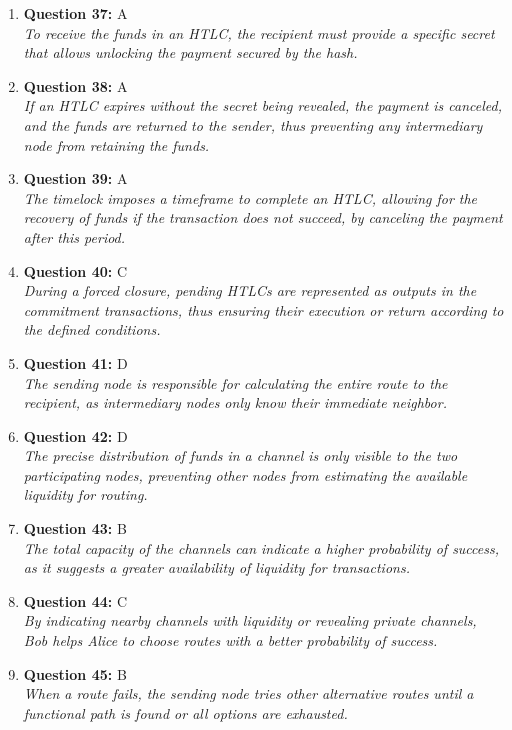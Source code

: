 \documentclass[12pt,a4paper]{article}
\begin{document}
\begin{enumerate}
\item \textbf{Question 37:} A
\\ \textit{To receive the funds in an HTLC, the recipient must provide a specific secret that allows unlocking the payment secured by the hash.}

\item \textbf{Question 38:} A
\\ \textit{If an HTLC expires without the secret being revealed, the payment is canceled, and the funds are returned to the sender, thus preventing any intermediary node from retaining the funds.}

\item \textbf{Question 39:} A
\\ \textit{The timelock imposes a timeframe to complete an HTLC, allowing for the recovery of funds if the transaction does not succeed, by canceling the payment after this period.}

\item \textbf{Question 40:} C
\\ \textit{During a forced closure, pending HTLCs are represented as outputs in the commitment transactions, thus ensuring their execution or return according to the defined conditions.}

\item \textbf{Question 41:} D
\\ \textit{The sending node is responsible for calculating the entire route to the recipient, as intermediary nodes only know their immediate neighbor.}

\item \textbf{Question 42:} D
\\ \textit{The precise distribution of funds in a channel is only visible to the two participating nodes, preventing other nodes from estimating the available liquidity for routing.}

\item \textbf{Question 43:} B
\\ \textit{The total capacity of the channels can indicate a higher probability of success, as it suggests a greater availability of liquidity for transactions.}

\item \textbf{Question 44:} C
\\ \textit{By indicating nearby channels with liquidity or revealing private channels, Bob helps Alice to choose routes with a better probability of success.}

\item \textbf{Question 45:} B
\\ \textit{When a route fails, the sending node tries other alternative routes until a functional path is found or all options are exhausted.}


\end{enumerate}
\end{document}
